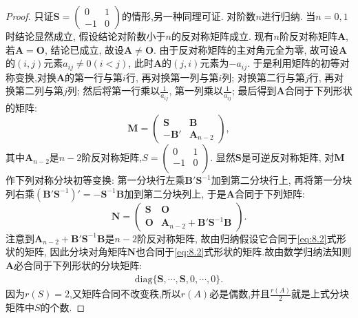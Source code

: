 \documentclass[../../main.tex]{subfiles}%
\begin{document}
\begin{proof}

只证$\boldsymbol{S}=\begin{pmatrix}
0 & 1 \\
-1 & 0
\end{pmatrix}$的情形,另一种同理可证.
对阶数$n$进行归纳. 当$n = 0, 1$时结论显然成立, 假设结论对阶数小于$n$的反对称矩阵成立. 现有$n$阶反对称矩阵$\boldsymbol{A}$, 若$\boldsymbol{A}=\boldsymbol{O}$, 结论已成立, 故设$\boldsymbol{A}\neq\boldsymbol{O}$. 由于反对称矩阵的主对角元全为零, 故可设$\boldsymbol{A}$的$(i, j)$元素$a_{ij}\neq 0 (i < j)$, 此时$\boldsymbol{A}$的$(j, i)$元素为$-a_{ij}$. 于是利用矩阵的初等对称变换,对换$\boldsymbol{A}$的第一行与第$i$行, 再对换第一列与第$i$列; 对换第二行与第$j$行, 再对换第二列与第$j$列; 然后将第一行乘以$\frac{1}{a_{ij}}$, 第一列乘以$\frac{1}{a_{ij}}$; 最后得到$\boldsymbol{A}$合同于下列形状的矩阵:
\[
\boldsymbol{M}=\begin{pmatrix}
\boldsymbol{S} & \boldsymbol{B} \\
-\boldsymbol{B}' & \boldsymbol{A}_{n - 2}
\end{pmatrix},
\]
其中$\boldsymbol{A}_{n - 2}$是$n - 2$阶反对称矩阵,$S=\left( \begin{matrix}
0&		1\\
-1&		0\\
\end{matrix} \right) $. 显然$\boldsymbol{S}$是可逆反对称矩阵, 对$\boldsymbol{M}$作下列对称分块初等变换: 第一分块行左乘$\boldsymbol{B}'\boldsymbol{S}^{-1}$加到第二分块行上, 再将第一分块列右乘$(\boldsymbol{B}'\boldsymbol{S}^{-1})'=-\boldsymbol{S}^{-1}\boldsymbol{B}$加到第二分块列上, 于是$\boldsymbol{A}$合同于下列矩阵:
\[
\boldsymbol{N}=\begin{pmatrix}
\boldsymbol{S} & \boldsymbol{O} \\
\boldsymbol{O} & \boldsymbol{A}_{n - 2}+\boldsymbol{B}'\boldsymbol{S}^{-1}\boldsymbol{B}
\end{pmatrix}.
\]
注意到$\boldsymbol{A}_{n - 2}+\boldsymbol{B}'\boldsymbol{S}^{-1}\boldsymbol{B}$是$n - 2$阶反对称矩阵, 故由归纳假设它合同于\eqref{eq:8.2}式形状的矩阵, 因此分块对角矩阵$\boldsymbol{N}$也合同于\eqref{eq:8.2}式形状的矩阵.故由数学归纳法知则$\boldsymbol{A}$必合同于下列形状的分块矩阵:
\begin{align*}
\text{diag}\{\boldsymbol{S}, \cdots, \boldsymbol{S}, 0, \cdots, 0\}.
\end{align*}
因为$r(S)=2$,又矩阵合同不改变秩,所以$r(A)$必是偶数,并且$\frac{r(A)}{2}$就是上式分块矩阵中$S$的个数.
\end{proof}
\end{document}
